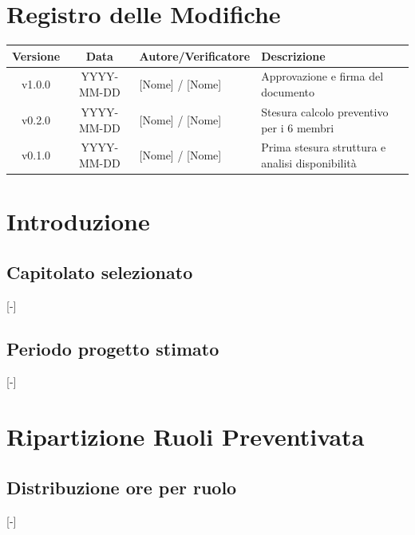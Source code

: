 \documentclass[11pt, a4paper]{article}
\begin{document}
	\section*{Registro delle Modifiche}
	\begin{table}[ht]
		\centering
		\renewcommand{\arraystretch}{1.5}
		\begin{tabularx}{\textwidth}{c c l X}
			\toprule
			\textbf{Versione} & \textbf{Data} & \textbf{Autore/Verificatore} & \textbf{Descrizione} \\
			\midrule
			v1.0.0 & YYYY-MM-DD & {[Nome] / [Nome]} & Approvazione e firma del documento \\
			v0.2.0 & YYYY-MM-DD & {[Nome] / [Nome]} & Stesura calcolo preventivo per i 6 membri \\
			v0.1.0 & YYYY-MM-DD & {[Nome] / [Nome]} & Prima stesura struttura e analisi disponibilità \\
			\bottomrule
		\end{tabularx}
	\end{table}
	
	\newpage
	
	\tableofcontents
	\newpage
	
	\section{Introduzione}
	
	\subsection{Capitolato selezionato}
	[-]
	
	\subsection{Periodo progetto stimato}
	[-]
	
	\section{Ripartizione Ruoli Preventivata}
	
	\subsection{Distribuzione ore per ruolo}
	[-]
	
\end{document}
